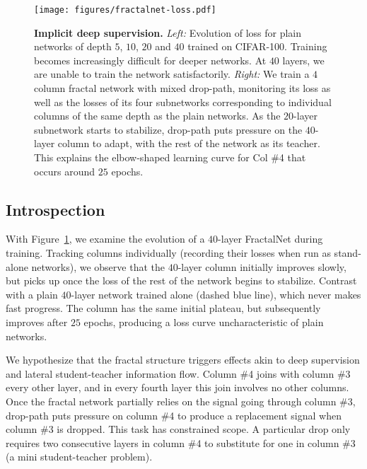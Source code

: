 \documentclass{article}
\newcommand{\fracnet}{FractalNet}
\newcommand{\droppath}{drop-path}
\begin{document}
\begin{figure}
   \begin{center}
      \texttt{[image: figures/fractalnet-loss.pdf]}
   \end{center}
   \vspace{-0.4cm}
   \caption{
      \textbf{Implicit deep supervision.}
      \emph{Left:}
         Evolution of loss for plain networks of depth $5$, $10$, $20$ and
         $40$ trained on CIFAR-100.  Training becomes increasingly difficult
         for deeper networks.  At $40$ layers, we are unable to train the
         network satisfactorily.
      \emph{Right:}
         We train a $4$ column fractal network with mixed \droppath{},
         monitoring its loss as well as the losses of its four subnetworks
         corresponding to individual columns of the same depth as the plain
         networks.  As the $20$-layer subnetwork starts to stabilize,
         \droppath{} puts pressure on the $40$-layer column to adapt, with the
         rest of the network as its teacher.  This explains the elbow-shaped
         learning curve for Col \#4 that occurs around $25$ epochs.
   }
\label{fig:fractalnet-loss}
\end{figure}

\subsection{Introspection}
\label{sec:introspection}

With Figure~\ref{fig:fractalnet-loss}, we examine the evolution of a $40$-layer
{\fracnet} during training.  Tracking columns individually (recording their
losses when run as stand-alone networks), we observe that the $40$-layer column
initially improves slowly, but picks up once the loss of the rest of the
network begins to stabilize.  Contrast with a plain $40$-layer network trained
alone (dashed blue line), which never makes fast progress.  The column has the
same initial plateau, but subsequently improves after $25$ epochs, producing a
loss curve uncharacteristic of plain networks.

We hypothesize that the fractal structure triggers effects akin to deep
supervision and lateral student-teacher information flow.  Column \#4 joins
with column \#3 every other layer, and in every fourth layer this join
involves no other columns.  Once the fractal network partially relies on the
signal going through column \#3, {\droppath} puts pressure on column \#4 to
produce a replacement signal when column \#3 is dropped.  This task has
constrained scope.  A particular drop only requires two consecutive layers in
column \#4 to substitute for one in column \#3 (a mini student-teacher
problem).
\end{document}
